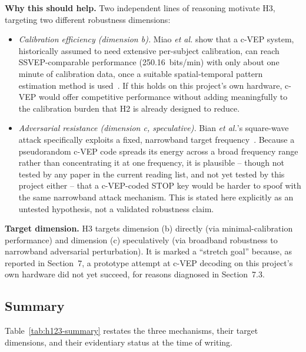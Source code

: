 \documentclass[11pt]{article}
\begin{document}
\textbf{Why this should help.} Two independent lines of reasoning motivate H3, targeting two different robustness dimensions:
\begin{itemize}
  \item \emph{Calibration efficiency (dimension b).} Miao \textit{et al.} show that a c-VEP system, historically assumed to need extensive per-subject calibration, can reach SSVEP-comparable performance (250.16~bits/min) with only about one minute of calibration data, once a suitable spatial-temporal pattern estimation method is used~\cite{miao2024cvepminimal}. If this holds on this project's own hardware, c-VEP would offer competitive performance without adding meaningfully to the calibration burden that H2 is already designed to reduce.
  \item \emph{Adversarial resistance (dimension c, speculative).} Bian \textit{et al.}'s square-wave attack specifically exploits a fixed, narrowband target frequency~\cite{bian2022squarewave}. Because a pseudorandom c-VEP code spreads its energy across a broad frequency range rather than concentrating it at one frequency, it is plausible -- though not tested by any paper in the current reading list, and not yet tested by this project either -- that a c-VEP-coded STOP key would be harder to spoof with the same narrowband attack mechanism. This is stated here explicitly as an untested hypothesis, not a validated robustness claim.
\end{itemize}

\textbf{Target dimension.} H3 targets dimension (b) directly (via minimal-calibration performance) and dimension (c) speculatively (via broadband robustness to narrowband adversarial perturbation). It is marked a ``stretch goal'' because, as reported in Section~7, a prototype attempt at c-VEP decoding on this project's own hardware did not yet succeed, for reasons diagnosed in Section~7.3.

\subsection{Summary}

Table~\ref{tab:h123-summary} restates the three mechanisms, their target dimensions, and their evidentiary status at the time of writing.
\end{document}
